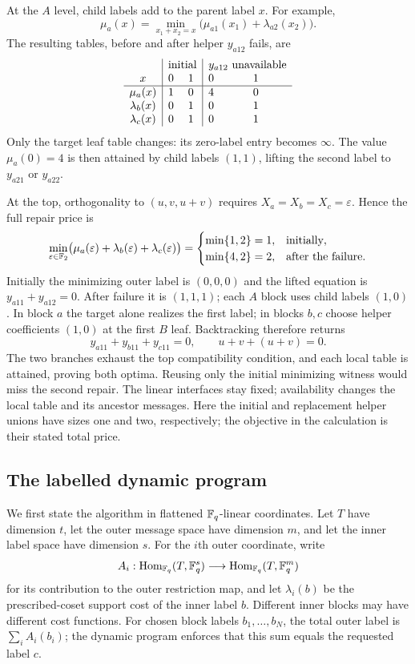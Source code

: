At the $A$ level, child labels add to the parent label $x$.
For example,
\[
 \mu_a(x)=\min_{x_1+x_2=x}
       \bigl(\mu_{a1}(x_1)+\lambda_{a2}(x_2)\bigr).
\]
The resulting tables, before and after helper $y_{a12}$ fails, are
\[
\begin{array}{c|cc|cc}
 &\multicolumn{2}{c|}{\text{initial}}&\multicolumn{2}{c}{y_{a12}\text{ unavailable}}\\
 x&0&1&0&1\\ \hline
 \mu_a(x)&1&0&4&0\\
 \lambda_b(x)&0&1&0&1\\
 \lambda_c(x)&0&1&0&1
\end{array}
\]
Only the target leaf table changes: its zero-label entry becomes $\infty$.
The value $\mu_a(0)=4$ is then attained by child labels $(1,1)$, lifting
the second label to $y_{a21}$ or $y_{a22}$.

At the top, orthogonality to $(u,v,u+v)$ requires
$X_a=X_b=X_c=\varepsilon$.  Hence the full repair price is
\[
 \min_{\varepsilon\in\mathbb F_2}
 \bigl(\mu_a(\varepsilon)+\lambda_b(\varepsilon)
                         +\lambda_c(\varepsilon)\bigr)
 =\begin{cases}\min\{1,2\}=1,&\text{initially},\\
                 \min\{4,2\}=2,&\text{after the failure}.
   \end{cases}
\]
Initially the minimizing outer label is $(0,0,0)$ and the lifted equation is
$y_{a11}+y_{a12}=0$.  After failure it is $(1,1,1)$; each $A$ block uses
child labels $(1,0)$.  In block $a$ the target alone realizes the first
label; in blocks $b,c$ choose helper coefficients $(1,0)$ at the first
$B$ leaf.  Backtracking therefore returns
\[
 y_{a11}+y_{b11}+y_{c11}=0,
 \qquad u+v+(u+v)=0.
\]
The two branches exhaust the top compatibility condition, and each local
table is attained, proving both optima.  Reusing only the initial minimizing
witness would miss the second repair.  The linear interfaces stay fixed;
availability changes the local table and its ancestor messages.  Here the
initial and replacement helper unions have sizes one and two, respectively;
the objective in the calculation is their stated total price.

\subsection{The labelled dynamic program}

We first state the algorithm in flattened $\mathbb F_q$-linear coordinates.  Let
$T$ have dimension $t$, let the outer message space have dimension $m$, and
let the inner label space have dimension $s$.  For the $i$th outer coordinate,
write
\[
 A_i:\operatorname{Hom}_{\mathbb F_q}(T,\mathbb F_q^s)
       \longrightarrow \operatorname{Hom}_{\mathbb F_q}(T,\mathbb F_q^m)
\]
for its contribution to the outer restriction map, and let
$\lambda_i(b)$ be the prescribed-coset support cost of the inner label $b$.
Different inner blocks may have different cost functions.
For chosen block labels $b_1,\ldots,b_N$, the total outer label is
$\sum_iA_i(b_i)$; the dynamic program enforces that this sum equals the
requested label $c$.

